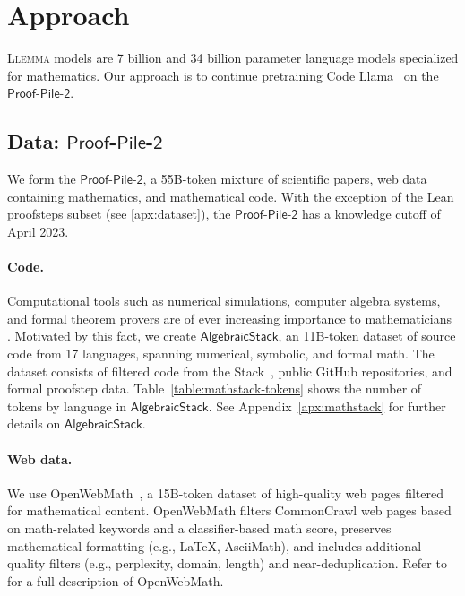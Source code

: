 \section{Approach}
\textsc{Llemma} models are 7 billion and 34 billion parameter language models specialized for mathematics. Our approach is to continue pretraining Code Llama~\citep{roziere2023code} on the $\mathsf{Proof}$-$\mathsf{Pile}$-$\mathsf{2}$.

\subsection{Data: $\mathsf{Proof}$-$\mathsf{Pile}$-$\mathsf{2}$}
\label{sec:data}
We form the $\mathsf{Proof}$-$\mathsf{Pile}$-$\mathsf{2}$, a 55B-token mixture of scientific papers, web data containing mathematics, and mathematical code. With the exception of the Lean proofsteps subset (see \autoref{apx:dataset}), the $\mathsf{Proof}$-$\mathsf{Pile}$-$\mathsf{2}$ has a knowledge cutoff of April 2023.

\paragraph{Code.} 
Computational tools such as numerical simulations, computer algebra systems, and formal theorem provers are of ever increasing importance to mathematicians \citep{avigad2018mechanization}. Motivated by this fact, we create $\mathsf{AlgebraicStack}$, an 11B-token dataset of source code from 17 languages, spanning numerical, symbolic, and formal math. The dataset consists of filtered code from  the Stack~\citep{kocetkov2022TheStack}, public GitHub repositories, and   formal proofstep data. 
Table~\ref{table:mathstack-tokens} shows the number of tokens by language in $\mathsf{AlgebraicStack}$. 
See Appendix~\ref{apx:mathstack} for further details on $\mathsf{AlgebraicStack}$.

\paragraph{Web data.} We use OpenWebMath~\citep{openwebmath}, a 15B-token dataset of high-quality web pages filtered for mathematical content. OpenWebMath filters CommonCrawl web pages based on math-related keywords and a classifier-based math score, preserves mathematical formatting (e.g., \LaTeX{}, AsciiMath), and includes additional quality filters (e.g., perplexity, domain, length) and near-deduplication. Refer to \citet{openwebmath} for a full description of OpenWebMath.

